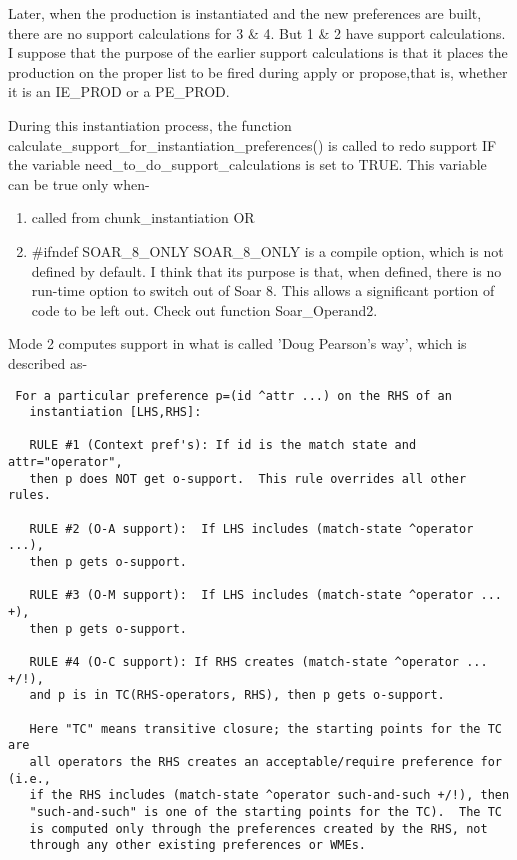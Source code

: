 {Later, when the production is instantiated and the new preferences are built, there are no support calculations for 3 \& 4. But 1 \& 2 have support calculations. I suppose that the purpose of the earlier support calculations is that it places the production on the proper list to be fired during apply or propose,that is, whether it is an IE\_PROD or a PE\_PROD.

During this instantiation process, the function calculate\_support\_for\_instantiation\_preferences() is called to redo support IF the variable need\_to\_do\_support\_calculations is set to TRUE. This variable can be true only when-

\begin{enumerate}
\item  called from chunk\_instantiation OR
\item  \#ifndef SOAR\_8\_ONLY
SOAR\_8\_ONLY is a compile option, which is not defined by default. I think that its purpose is that, when defined, there is no run-time option to switch out of Soar 8. This allows a significant portion of code to be left out. Check out function Soar\_Operand2. 
\end{enumerate}


Mode 2 computes support in what is called 'Doug Pearson's way', which is described as-

 \begin{verbatim}
 For a particular preference p=(id ^attr ...) on the RHS of an
   instantiation [LHS,RHS]:

   RULE #1 (Context pref's): If id is the match state and attr="operator", 
   then p does NOT get o-support.  This rule overrides all other rules.

   RULE #2 (O-A support):  If LHS includes (match-state ^operator ...),
   then p gets o-support.

   RULE #3 (O-M support):  If LHS includes (match-state ^operator ... +),
   then p gets o-support.

   RULE #4 (O-C support): If RHS creates (match-state ^operator ... +/!),
   and p is in TC(RHS-operators, RHS), then p gets o-support.

   Here "TC" means transitive closure; the starting points for the TC are 
   all operators the RHS creates an acceptable/require preference for (i.e., 
   if the RHS includes (match-state ^operator such-and-such +/!), then 
   "such-and-such" is one of the starting points for the TC).  The TC
   is computed only through the preferences created by the RHS, not
   through any other existing preferences or WMEs.


\end{verbatim}}
